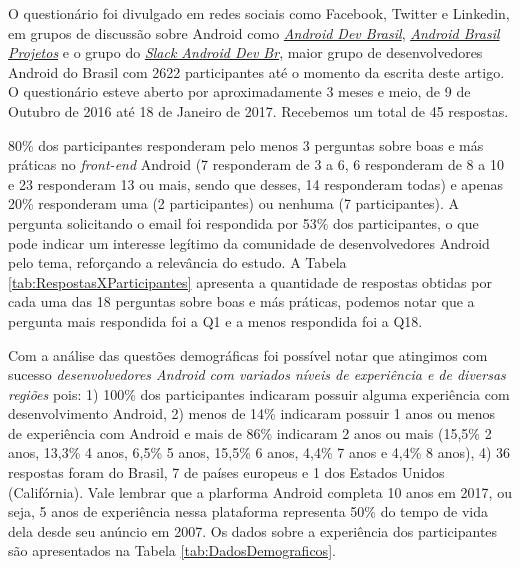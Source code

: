 O questionário foi divulgado em redes sociais como Facebook, Twitter e Linkedin, em grupos de discussão sobre Android como \href{https://groups.google.com/forum/#!forum/androidbrasil-dev}{\textit{Android Dev Brasil}}, \href{https://groups.google.com/forum/\#!forum/android-brasil--projetos}{\textit{Android Brasil Projetos}} e o grupo do \href{http://slack.androiddevbr.org/}{\textit{Slack Android Dev Br}}, maior grupo de desenvolvedores Android do Brasil com 2622 participantes até o momento da escrita deste artigo. 
O questionário esteve aberto por aproximadamente 3 meses e meio, de 9 de Outubro de 2016 até 18 de Janeiro de 2017. Recebemos um total de 45 respostas. 

80\% dos participantes responderam pelo menos 3 perguntas sobre boas e más práticas no \textit{front-end} Android (7 responderam de 3 a 6, 6 responderam de 8 a 10 e 23 responderam 13 ou mais, sendo que desses, 14 responderam todas) e apenas 20\% responderam uma (2 participantes) ou nenhuma (7 participantes). A pergunta solicitando o email foi respondida por 53\% dos participantes, o que pode indicar um interesse legítimo da comunidade de desenvolvedores Android pelo tema, reforçando a relevância do estudo. A Tabela \ref{tab:RespostasXParticipantes} apresenta a quantidade de respostas obtidas por cada uma das 18 perguntas sobre boas e más práticas, podemos notar que a pergunta mais respondida foi a Q1 e a menos respondida foi a Q18.

Com a análise das questões demográficas foi possível notar que atingimos com sucesso \textit{desenvolvedores Android com variados níveis de experiência e de diversas regiões} pois: 1) 100\% dos participantes indicaram possuir alguma experiência com desenvolvimento Android, 2) menos de 14\% indicaram possuir 1 anos ou menos de experiência com Android e mais de 86\% indicaram 2 anos ou mais (15,5\% 2 anos, 13,3\% 4 anos, 6,5\% 5 anos, 15,5\% 6 anos, 4,4\% 7 anos e 4,4\% 8 anos), 4) 36 respostas foram do Brasil, 7 de países europeus e 1 dos Estados Unidos (Califórnia). Vale lembrar que a plarforma Android completa 10 anos em 2017, ou seja, 5 anos de experiência nessa plataforma representa 50\% do tempo de vida dela desde seu anúncio em 2007. Os dados sobre a experiência dos participantes são apresentados na Tabela \ref{tab:DadosDemograficos}.

